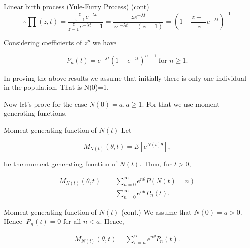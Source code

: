 \documentclass[12pt,ignorenonframetext,]{beamer}
\begin{document}
\begin{frame}{Linear birth process (Yule-Furry Process) (cont)}
\protect\hypertarget{linear-birth-process-yule-furry-process-cont-3}{}
\[ \therefore \prod (z, t) = \frac{\frac{z}{z-1}e^{-\lambda t}}{\frac{z}{z-1}e^{-\lambda t} - 1} = \frac{z e^{-\lambda t}}{z e ^{-\lambda t} - (z-1)}= \left(1-\frac{z-1}{z}e^{-\lambda t} \right)^{-1}\]

Considering coefficients of \(z^n\) we have

\[P_n(t) = e^{-\lambda t}{(1-e^{-\lambda t})^{n-1}} \text{ for } n \geq 1.\]

In proving the above results we assume that initially there is only one
individual in the population. That is N(0)=1.

Now let's prove for the case \(N(0) = a, a \geq 1.\) For that we use
moment generating functions.
\end{frame}

\begin{frame}{Moment generating function of \(N(t)\)}
\protect\hypertarget{moment-generating-function-of-nt}{}
Let

\[M_{N(t)}(\theta, t) = E[e^{N(t)\theta}],\]

be the moment generating function of \(N(t).\) Then, for \(t > 0,\)

\begin{equation} \label{eq1}
\begin{split}
M_{N(t)}(\theta, t) & = \sum_{n=0}^\infty e^{n \theta} P(N(t)=n)\\
 & = \sum_{n=0}^\infty e^{n \theta} P_n(t).
\end{split}
\end{equation}
\end{frame}

\begin{frame}{Moment generating function of \(N(t)\) (cont.)}
\protect\hypertarget{moment-generating-function-of-nt-cont.}{}
We assume that \(N(0) = a > 0\). Hence, \(P_n(t) = 0\) for all
\(n < a\). Hence,

\begin{equation} \label{eq1}
\begin{split}
M_{N(t)}(\theta, t) = \sum_{n=a}^\infty e^{n \theta} P_n(t).
\end{split}
\end{equation}
\end{frame}
\end{document}
